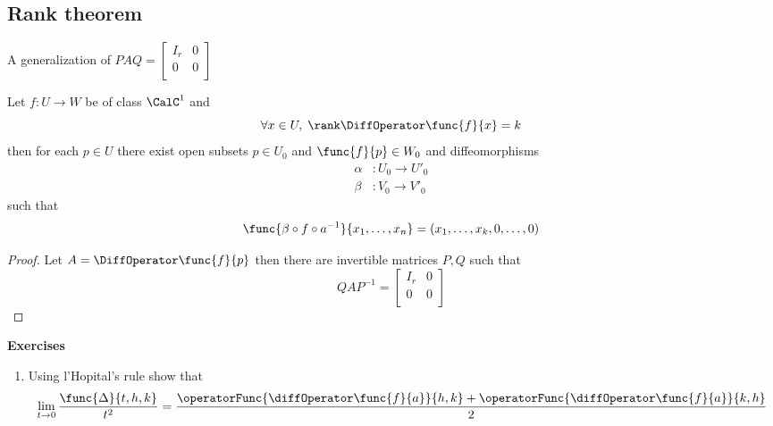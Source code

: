 \subsection{Rank theorem}
A generalization of \(PAQ = \begin{bmatrix}
    I_r & 0 \\
    0   & 0 \\
\end{bmatrix}\)
\begin{theorem}
    Let \(f: U \to W\) be of class \(\CalC^1\) and
    \begin{equation*}
        \forall x \in U, \; \rank \DiffOperator \func{f}{x} = k
    \end{equation*}
    then for each \(p \in U\) there exist open subsets \(p \in U_0\) and \(\func{f}{p} \in W_0\) and diffeomorphisms
    \begin{align*}
        \alpha & : U_0 \to U'_0 \\
        \beta  & : V_0 \to V'_0
    \end{align*}
    such that
    \begin{equation*}
        \func{ \beta \circ f \circ a^{-1} }{x_1, \dots, x_n} = (x_1, \dots , x_k, 0 , \dots, 0)
    \end{equation*}
\end{theorem}

\begin{proof}
    Let \(A = \DiffOperator \func{f}{p}\) then there are invertible matrices \(P,Q\) such that
    \begin{equation*}
        Q A P^{-1} = \begin{bmatrix}
            I_r & 0 \\
            0   & 0 \\
        \end{bmatrix}
    \end{equation*}
\end{proof}

{\Large\textbf{Exercises}}
\begin{enumerate}
    \item Using l'Hopital's rule show that
          \begin{equation*}
              \lim_{t \to 0} \dfrac{\func{\Delta}{t,h,k}}{t^2} = \dfrac{\operatorFunc{\diffOperator \func{f}{a}}{h,k} + \operatorFunc{\diffOperator \func{f}{a}}{k,h}}{2}
          \end{equation*}
\end{enumerate}
\newpage
